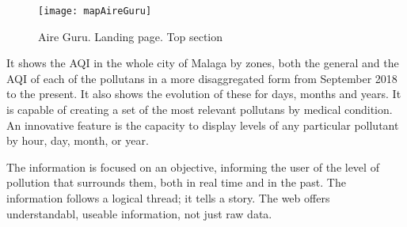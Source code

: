 \newpage
\begin{figure}[ht]
    \centering
    \texttt{[image: mapAireGuru]}
    \caption{Aire Guru. Landing page. Top section}
\end{figure}

It shows the AQI in the whole city of Malaga by zones, both the general and the AQI of each of the 
pollutans in a more disaggregated form from September 2018 to the present. It also shows the evolution
of these for days, months and years.
It is capable of creating a set of the most relevant pollutans by medical condition. An innovative feature is the capacity to display levels of any particular pollutant by hour, day, month, or year. 


\begin{itemize}
\done The information is focused on an objective, informing the user of the level of pollution that surrounds them, both  in real time
and in the past.
\done The information follows a logical thread; it tells a story.
\done The web offers understandabl, useable information, not just raw data.
\end{itemize}

\newpage